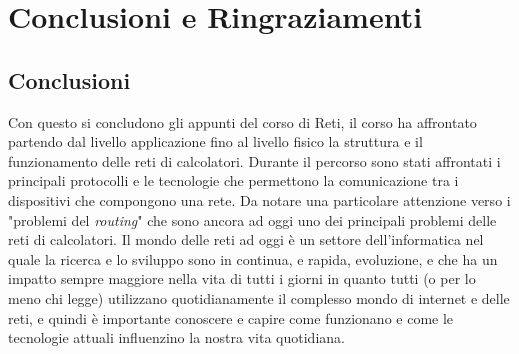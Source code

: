 \chapter*{Conclusioni e Ringraziamenti}
\thispagestyle{chapterInit}

\section*{Conclusioni}
Con questo si concludono gli appunti del corso di Reti, il corso ha affrontato partendo dal livello applicazione fino al livello fisico la struttura e il funzionamento delle reti di calcolatori. Durante il percorso sono stati affrontati i principali protocolli e le tecnologie che permettono la comunicazione tra i dispositivi che compongono una rete. Da notare una particolare attenzione verso i "problemi del \textit{routing}" che sono ancora ad oggi uno dei principali problemi delle reti di calcolatori. Il mondo delle reti ad oggi è un settore dell'informatica nel quale la ricerca e lo sviluppo sono in continua, e rapida, evoluzione, e che ha un impatto sempre maggiore nella vita di tutti i giorni in quanto tutti (o per lo meno chi legge) utilizzano quotidianamente il complesso mondo di internet e delle reti, e quindi è importante conoscere e capire come funzionano e come le tecnologie attuali influenzino la nostra vita quotidiana.
